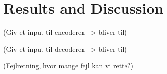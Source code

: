 \documentclass[Main]{subfiles}
\begin{document}
\section*{Results and Discussion}

(Giv et input til encoderen --> bliver til)

(Giv et input til decoderen --> bliver til)

(Fejlretning, hvor mange fejl kan vi rette?)
\end{document}
